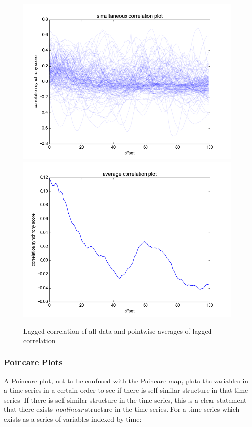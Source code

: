 \documentclass[12pt]{article}
\begin{document}
\begin{figure}
  \centering
    \includegraphics[scale=0.6]{correlation_mc}
    \includegraphics[scale=0.6]{correlation_summary}
  \caption{Lagged correlation of all data and pointwise averages of lagged correlation}
  \label{fig:lag_correlation}
\end{figure}

\subsubsection{Poincare Plots}

A Poincare plot\cite{hrv1}, not to be confused with the Poincare map, plots the variables in a time series in a certain order to see if there is self-similar structure in that time series. If there is self-similar structure in the time series, this is a clear statement that there exists \emph{nonlinear} structure in the time series\cite{hrv1}. For a time series which exists as a series of variables indexed by time:
\end{document}
